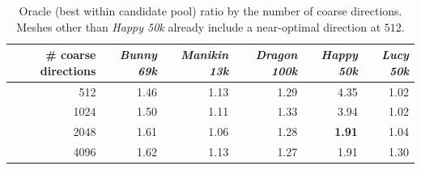 \documentclass[11pt,a4paper]{article}
\begin{document}
\begin{table}[H]
\centering
\caption{Oracle (best within candidate pool) ratio by the number of coarse directions. Meshes other than \emph{Happy 50k}
already include a near-optimal direction at $512$.}
\label{stab:sampling}
\begin{tabular}{rrrrrr}
\toprule
\# coarse directions & \emph{Bunny 69k} & \emph{Manikin 13k} & \emph{Dragon 100k} & \emph{Happy 50k} & \emph{Lucy 50k}\\
\midrule
512  & 1.46 & 1.13 & 1.29 & 4.35 & 1.02\\
1024 & 1.50 & 1.11 & 1.33 & 3.94 & 1.02\\
2048 & 1.61 & 1.06 & 1.28 & \textbf{1.91} & 1.04\\
4096 & 1.62 & 1.13 & 1.27 & 1.91 & 1.30\\
\bottomrule
\end{tabular}
\end{table}

\begin{table}[H]
\centering
\caption{Best-of-3 ratio of the objective-function ablation on the corrected grids (lower is better).
The proposed objective $J=R+P+B$ and the old objective including nuclear/$\sigma_1$ are nearly identical per mesh (they differ only on \emph{Dragon 100k}).}
\label{stab:ablation}
\end{table}
\end{document}
